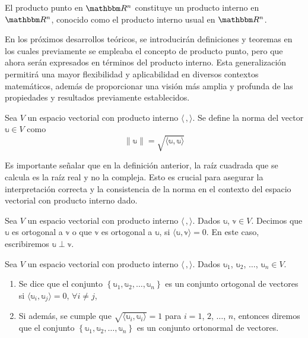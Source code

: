 \newpage

\begin{observation}
    El producto punto en $\RR[n]$ constituye un producto interno en $\RR[n]$, conocido como el producto interno usual en $\RR[n]$.
\end{observation}

En los próximos desarrollos teóricos, se introducirán definiciones y teoremas en los cuales previamente se empleaba el concepto de producto punto, pero que ahora serán expresados en términos del producto interno. Esta generalización permitirá una mayor flexibilidad y aplicabilidad en diversos contextos matemáticos, además de proporcionar una visión más amplia y profunda de las propiedades y resultados previamente establecidos.

\begin{definition}
    Sea $V$ un espacio vectorial con producto interno $\langle \, , \rangle$. Se define la norma del vector $\mathbb{u} \in V$ como
    $$\| \mathbb{u} \| = \sqrt{\langle \mathbb{u}, \mathbb{u} \rangle}$$
\end{definition}

\begin{observation}
    Es importante señalar que en la definición anterior, la raíz cuadrada que se calcula es la raíz real y no la compleja. Esto es crucial para asegurar la interpretación correcta y la consistencia de la norma en el contexto del espacio vectorial con producto interno dado.
\end{observation}

\begin{definition}
    Sea $V$ un espacio vectorial con producto interno $\langle \, , \rangle$. Dados $\mathbb{u}$, $\mathbb{v} \in V$. Decimos que $\mathbb{u}$ es ortogonal a $\mathbb{v}$ o que $\mathbb{v}$ es ortogonal a $\mathbb{u}$, si $\langle \mathbb{u}, \mathbb{v} \rangle = 0$. En este caso, escribiremos $\mathbb{u} \perp \mathbb{v}$.
\end{definition}

\begin{definition}
    Sea $V$ un espacio vectorial con producto interno $\langle \, , \rangle$. Dados $\mathbb{u}_1$, $\mathbb{u}_2$, $\dots$, $\mathbb{u}_n \in V$.
    \begin{enumerate}[label=\roman*)]
        \item Se dice que el conjunto $\left\{ \mathbb{u}_1, \mathbb{u}_2, \dots, \mathbb{u}_n \right\}$ es un conjunto ortogonal de vectores si $\langle \mathbb{u}_i, \mathbb{u}_j \rangle = 0$, $\forall i \neq j$,
        \item Si además, se cumple que $\sqrt{\langle \mathbb{u}_i, \mathbb{u}_i \rangle} = 1$ para $i = 1$, $2$, $\dots$, $n$, entonces diremos que el conjunto $\left\{ \mathbb{u}_1, \mathbb{u}_2, \dots, \mathbb{u}_n \right\}$ es un conjunto ortonormal de vectores.
    \end{enumerate}
\end{definition}

